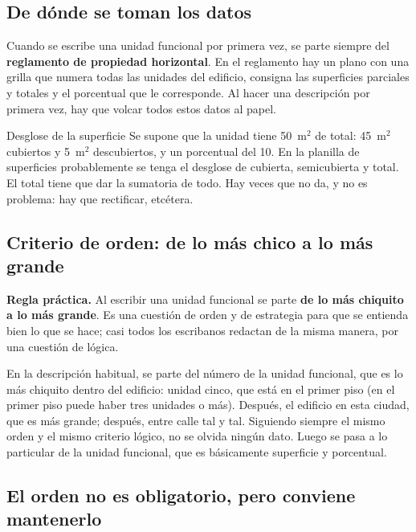 \documentclass[12pt,oneside]{book}
\newcommand{\mcuad}{$\mathrm{m}^2$}
\begin{document}
\subsection{De dónde se toman los datos}

Cuando se escribe una unidad funcional por primera vez, se parte siempre del \textbf{reglamento de propiedad horizontal}. En el reglamento hay un plano con una grilla que numera todas las unidades del edificio, consigna las superficies parciales y totales y el porcentual que le corresponde. Al hacer una descripción por primera vez, hay que volcar todos estos datos al papel.

\begin{example}{Desglose de la superficie}
Se supone que la unidad tiene 50~\mcuad{} de total: 45~\mcuad{} cubiertos y 5~\mcuad{} descubiertos, y un porcentual del 10. En la planilla de superficies probablemente se tenga el desglose de cubierta, semicubierta y total. El total tiene que dar la sumatoria de todo. Hay veces que no da, y no es problema: hay que rectificar, etcétera.
\end{example}

\subsection{Criterio de orden: de lo más chico a lo más grande}

\begin{important}
\textbf{Regla práctica.} Al escribir una unidad funcional se parte \textbf{de lo más chiquito a lo más grande}. Es una cuestión de orden y de estrategia para que se entienda bien lo que se hace; casi todos los escribanos redactan de la misma manera, por una cuestión de lógica.
\end{important}

En la descripción habitual, se parte del número de la unidad funcional, que es lo más chiquito dentro del edificio: unidad cinco, que está en el primer piso (en el primer piso puede haber tres unidades o más). Después, el edificio en esta ciudad, que es más grande; después, entre calle tal y tal. Siguiendo siempre el mismo orden y el mismo criterio lógico, no se olvida ningún dato. Luego se pasa a lo particular de la unidad funcional, que es básicamente superficie y porcentual.

\subsection{El orden no es obligatorio, pero conviene mantenerlo}
\end{document}
